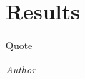 \documentclass[class=report,11pt,crop=false]{standalone}
\begin{document}
\chapter{Results}
\epigraph{Quote}%
    {\emph{Author}}

\blindtext


















\ifstandalone

\fi
\end{document}
